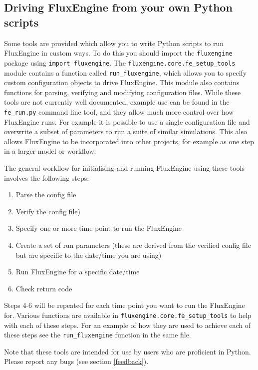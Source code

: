 \documentclass[]{scrartcl}
\begin{document}
\subsection{Driving FluxEngine from your own Python scripts}
Some tools are provided which allow you to write Python scripts to run FluxEngine in custom ways. To do this you should import the \texttt{fluxengine} package using \texttt{import fluxengine}. The \texttt{fluxengine.core.fe\_setup\_tools} module contains a function called \texttt{run\_fluxengine}, which allows you to specify custom configuration objects to drive FluxEngine. This module also contains functions for parsing, verifying and modifying configuration files. While these tools are not currently well documented, example use can be found in the \texttt{fe\_run.py} command line tool, and they allow much more control over how FluxEngine runs. For example it is possible to use a single configuration file and overwrite a subset of parameters to run a suite of similar simulations. This also allows FluxEngine to be incorporated into other projects, for example as one step in a larger model or workflow.

The general workflow for initialising and running FluxEngine using these tools involves the following steps:
\begin{enumerate}
	\item Parse the config file
	\item Verify the config file)
	\item Specify one or more time point to run the FluxEngine
	\item Create a set of run parameters (these are derived from the verified config file but are specific to the date/time you are using)
	\item Run FluxEngine for a specific date/time
	\item Check return code
\end{enumerate}

Steps 4-6 will be repeated for each time point you want to run the FluxEngine for. Various functions are available in \texttt{fluxengine.core.fe\_setup\_tools} to help with each of these steps. For an example of how they are used to achieve each of these steps see the \texttt{run\_fluxengine} function in the same file.

Note that these tools are intended for use by users who are proficient in Python. Please report any bugs (see section \ref{feedback}).
\end{document}
